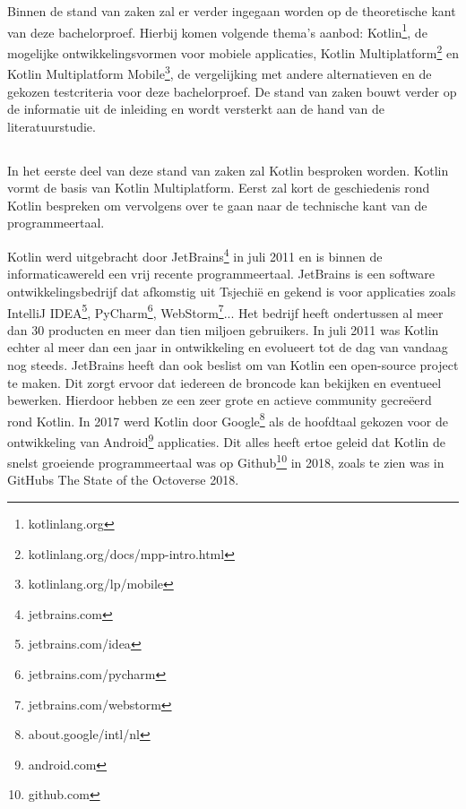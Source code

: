 \chapter{}
\label{ch:stand-van-zaken}

Binnen de stand van zaken zal er verder ingegaan worden op de theoretische kant van deze bachelorproef. Hierbij komen volgende thema's aanbod: Kotlin\footnote{kotlinlang.org}, de mogelijke ontwikkelingsvormen voor mobiele applicaties, Kotlin Multiplatform\footnote{kotlinlang.org/docs/mpp-intro.html} en Kotlin Multiplatform Mobile\footnote{kotlinlang.org/lp/mobile}, de vergelijking met andere alternatieven en de gekozen testcriteria voor deze bachelorproef. De stand van zaken bouwt verder op de informatie uit de inleiding en wordt versterkt aan de hand van de literatuurstudie. 


\section{}
\label{sec:SVZkotlin}

In het eerste deel van deze stand van zaken zal Kotlin besproken worden. Kotlin vormt de basis van Kotlin Multiplatform. Eerst zal kort de geschiedenis rond Kotlin bespreken om vervolgens over te gaan naar de technische kant van de programmeertaal.

Kotlin werd uitgebracht door JetBrains\footnote{jetbrains.com} in juli 2011 en is binnen de informaticawereld een vrij recente programmeertaal.\autocite{Jemerov2011} JetBrains is een software ontwikkelingsbedrijf dat afkomstig uit Tsjechië en gekend is voor applicaties zoals IntelliJ IDEA\footnote{jetbrains.com/idea}, PyCharm\footnote{jetbrains.com/pycharm}, WebStorm\footnote{jetbrains.com/webstorm}... Het bedrijf heeft ondertussen al meer dan 30 producten en meer dan tien miljoen gebruikers.\autocite{JetBrains2021} In juli 2011 was Kotlin echter al meer dan een jaar in ontwikkeling en evolueert tot de dag van vandaag nog steeds. JetBrains heeft dan ook beslist om van Kotlin een open-source project te maken. Dit zorgt ervoor dat iedereen de broncode kan bekijken en eventueel bewerken. Hierdoor hebben ze een zeer grote en actieve community gecreëerd rond Kotlin. In 2017 werd Kotlin door Google\footnote{about.google/intl/nl} als de hoofdtaal gekozen voor de ontwikkeling van Android\footnote{android.com} applicaties.\autocite{Shafirov2017} Dit alles heeft ertoe geleid dat Kotlin de snelst groeiende programmeertaal was op Github\footnote{github.com} in 2018, zoals te zien was in GitHubs The State of the Octoverse 2018.\autocite{GitHub2018} 


